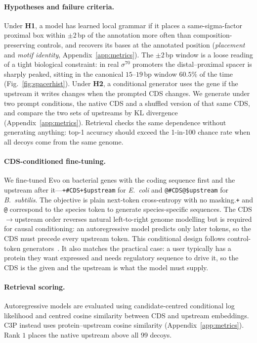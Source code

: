 \documentclass{article}
\begin{document}
\paragraph{Hypotheses and failure criteria.}
Under \textbf{H1}, a model has learned local grammar if it places a
same-sigma-factor proximal box within $\pm2$\,bp of the annotation more often than
composition-preserving controls, and recovers its bases at the annotated position
(\emph{placement} and \emph{motif identity}, Appendix~\ref{app:metrics}). The
$\pm2$\,bp window is a loose reading of a tight biological constraint: in real
$\sigma^{70}$ promoters the distal--proximal spacer is sharply peaked, sitting in
the canonical $15$--$19$\,bp window $60.5\%$ of the time
(Fig.~\ref{fig:spacerhist}).
Under \textbf{H2}, a conditional generator uses the gene if the upstream it writes
changes when the prompted CDS changes. We generate under two prompt conditions,
the native CDS and a shuffled version of that same CDS, and compare the two sets
of upstreams by KL divergence (Appendix~\ref{app:metrics}). Retrieval checks the
same dependence without generating anything: top-1 accuracy should exceed the
1-in-100 chance rate when all decoys come from the same genome.

\paragraph{CDS-conditioned fine-tuning.}
We fine-tuned Evo on bacterial genes with the coding sequence first and the
upstream after it---\texttt{+\#CDS+\$upstream} for \emph{E.~coli} and
\texttt{@\#CDS@\$upstream} for \emph{B.~subtilis}. The objective is plain
next-token cross-entropy with no masking.\texttt{+} and \texttt{@} correspond to the species token
to generate species-specific sequences. The CDS$\rightarrow$upstream order reverses natural left-to-right genome modelling but
is required for causal conditioning: an autoregressive model predicts only later
tokens, so the CDS must precede every upstream token. This conditional design
follows control-token generators~\citep{madani2023progen,
munsamy2024zymctrl,lal2024reglm,promogen2}. It also matches the practical case: a
user typically has a protein they want expressed and needs regulatory sequence to
drive it, so the CDS is the given and the upstream is what the model must
supply.

\paragraph{Retrieval scoring.}
Autoregressive models are evaluated using candidate-centred conditional log
likelihood and centred cosine similarity between CDS and upstream embeddings.
C3P instead uses protein--upstream cosine similarity
(Appendix~\ref{app:metrics}). Rank $1$ places the native upstream above all $99$
decoys.
\end{document}
